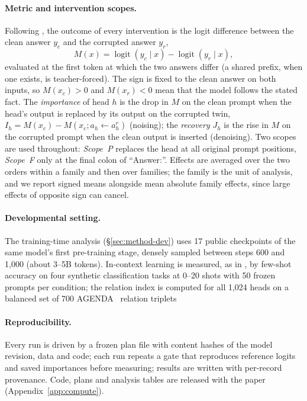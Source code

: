 \paragraph{Metric and intervention scopes.}
Following \citet{zhang2024bestpractices}, the outcome of every intervention is the
logit difference between the clean answer $y_c$ and the corrupted answer $y_r$,
\begin{equation}
\label{eq:metric}
M(x)=\operatorname{logit}(y_c\mid x)-\operatorname{logit}(y_r\mid x),
\end{equation}
evaluated at the first token at which the two answers differ (a shared prefix, when
one exists, is teacher-forced). The sign is fixed to the clean answer on both inputs,
so $M(x_c)>0$ and $M(x_r)<0$ mean that the model follows the stated fact. The
\emph{importance} of head $h$ is the drop in $M$ on the clean prompt when the head's
output is replaced by its output on the corrupted twin, $I_h=M(x_c)-M(x_c;a_h
\leftarrow a^r_h)$ (noising); the \emph{recovery} $J_h$ is the rise in $M$ on the
corrupted prompt when the clean output is inserted (denoising). Two scopes are used
throughout: \emph{Scope~P} replaces the head at all original prompt positions,
\emph{Scope~F} only at the final colon of ``Answer:''. Effects are averaged over the
two orders within a family and then over families; the family is the unit of
analysis, and we report signed means alongside mean absolute family effects, since
large effects of opposite sign can cancel.

\paragraph{Developmental setting.}
The training-time analysis (\S\ref{sec:method-dev}) uses 17 public checkpoints of
the same model's first pre-training stage, densely sampled between steps 600 and
1{,}000 (about 3--5B tokens). In-context learning is measured, as in
\citet{ren2024semantic}, by few-shot accuracy on four synthetic classification tasks
at 0--20 shots with 50 frozen prompts per condition; the relation index is computed
for all 1,024 heads on a balanced set of 700 AGENDA~\citep{koncelkedziorski2019text} relation triplets

\paragraph{Reproducibility.}
Every run is driven by a frozen plan file with content hashes of the model
revision, data and code; each run repeats a gate that reproduces reference logits and
saved importances before measuring; results are written with per-record provenance.
Code, plans and analysis tables are released with the paper
(Appendix~\ref{app:compute}).
